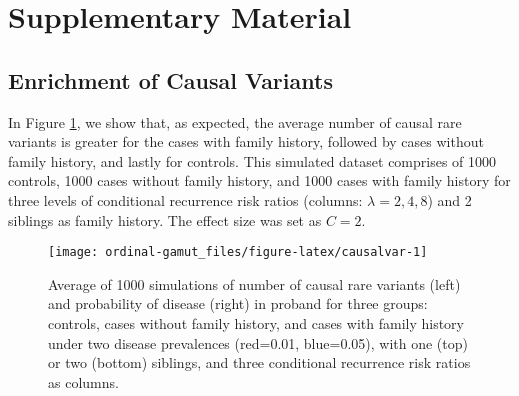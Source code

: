 \documentclass[]{article}
\begin{document}
\newpage

\hypertarget{supplementary-material}{%
\section*{Supplementary Material}\label{supplementary-material}}

\hypertarget{enrichment-of-causal-variants}{%
\subsection*{Enrichment of Causal
Variants}\label{enrichment-of-causal-variants}}

In Figure \ref{fig:causalvar}, we show that, as expected, the average
number of causal rare variants is greater for the cases with family
history, followed by cases without family history, and lastly for
controls. This simulated dataset comprises of 1000 controls, 1000 cases
without family history, and 1000 cases with family history for three
levels of conditional recurrence risk ratios (columns:
\(\lambda=2,4,8\)) and 2 siblings as family history. The effect size was
set as \(C=2\).

\begin{figure}[H]

{\centering \texttt{[image: ordinal-gamut\_files/figure-latex/causalvar-1]} 

}

\caption{Average of 1000 simulations of number of causal rare variants (left) and probability of disease (right) in proband for three groups: controls, cases without family history, and cases with family history under two disease prevalences (red=0.01, blue=0.05), with one (top) or two (bottom) siblings, and three conditional recurrence risk ratios as columns.}\label{fig:causalvar}
\end{figure}


\end{document}

